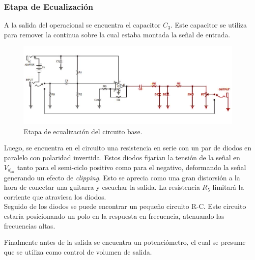 \subsubsection{Etapa de Ecualización}

A la salida del operacional se encuentra el capacitor $C_3$. Este capacitor se utiliza para remover la continua sobre la cual estaba montada la señal de entrada.

\begin{figure}[H]
	\centering
	\includegraphics[width=1\textwidth, trim={0 0 0 0}, clip]{Ejercicio5/Imagenes/Circuito_base/circuito_base_ecualizacion.png}
	\caption{Etapa de ecualización del circuito base.}
	\label{fig:circuito_base_ecualizacion}
\end{figure}

Luego, se encuentra en el circuito una resistencia en serie con un par de diodos en paralelo con polaridad invertida. Estos diodos fijarían la tensión de la señal en $V_{d_{on}}$ tanto para el semi-ciclo positivo como para el negativo, deformando la señal generando un efecto de \textit{clipping}. Esto se aprecia como una gran distorsión a la hora de conectar una guitarra y escuchar la salida. La resistencia $R_5$ limitará la corriente que atraviesa los diodos.  \\

Seguido de los diodos se puede encontrar un pequeño circuito R-C. Este circuito estaría posicionando un polo en la respuesta en frecuencia, atenuando las frecuencias altas. 

Finalmente antes de la salida se encuentra un potenciómetro, el cual se presume que se utiliza como control de volumen de salida.


